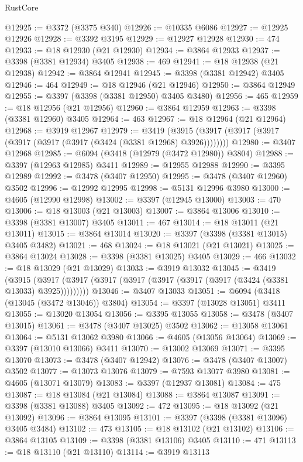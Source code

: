 \begin{lexlean}{RustCore}
\begin{coremodule}
@12925 := @3372 (@3375 @340)
@12926 := @10335 @6086
@12927 := @12925 @12926
@12928 := @3392 @3195
@12929 := @12927 @12928
@12930 := 474
@12933 := @18 @12930 (@21 @12930)
@12934 := @3864 @12933
@12937 := @3398 (@3381 @12934) @3405
@12938 := 469
@12941 := @18 @12938 (@21 @12938)
@12942 := @3864 @12941
@12945 := @3398 (@3381 @12942) @3405
@12946 := 464
@12949 := @18 @12946 (@21 @12946)
@12950 := @3864 @12949
@12955 := @3397 (@3398 (@3381 @12950) @3405 @3480)
@12956 := 465
@12959 := @18 @12956 (@21 @12956)
@12960 := @3864 @12959
@12963 := @3398 (@3381 @12960) @3405
@12964 := 463
@12967 := @18 @12964 (@21 @12964)
@12968 := @3919 @12967
@12979 := @3419 (@3915 (@3917 (@3917 (@3917 (@3917 (@3917 (@3917 (@3424 (@3381 @12968) @3926))))))))
@12980 := @3407 @12968
@12985 := @6094 (@3418 (@12979 (@3472 @12980)) @3804)
@12988 := @3397 (@12963 @12985) @3411
@12989 := @12955 @12988
@12990 := @3395 @12989
@12992 := @3478 (@3407 @12950)
@12995 := @3478 (@3407 @12960) @3502
@12996 := @12992 @12995
@12998 := @5131 @12996 @3980
@13000 := @4605 (@12990 @12998)
@13002 := @3397 (@12945 @13000)
@13003 := 470
@13006 := @18 @13003 (@21 @13003)
@13007 := @3864 @13006
@13010 := @3398 (@3381 @13007) @3405
@13011 := 467
@13014 := @18 @13011 (@21 @13011)
@13015 := @3864 @13014
@13020 := @3397 (@3398 (@3381 @13015) @3405 @3482)
@13021 := 468
@13024 := @18 @13021 (@21 @13021)
@13025 := @3864 @13024
@13028 := @3398 (@3381 @13025) @3405
@13029 := 466
@13032 := @18 @13029 (@21 @13029)
@13033 := @3919 @13032
@13045 := @3419
    (@3915 (@3917 (@3917 (@3917 (@3917 (@3917 (@3917 (@3917 (@3424 (@3381 @13033) @3925)))))))))
@13046 := @3407 @13033
@13051 := @6094 (@3418 (@13045 (@3472 @13046)) @3804)
@13054 := @3397 (@13028 @13051) @3411
@13055 := @13020 @13054
@13056 := @3395 @13055
@13058 := @3478 (@3407 @13015)
@13061 := @3478 (@3407 @13025) @3502
@13062 := @13058 @13061
@13064 := @5131 @13062 @3980
@13066 := @4605 (@13056 @13064)
@13069 := @3397 (@13010 @13066) @3411
@13070 := @13002 @13069
@13071 := @3395 @13070
@13073 := @3478 (@3407 @12942)
@13076 := @3478 (@3407 @13007) @3502
@13077 := @13073 @13076
@13079 := @7593 @13077 @3980
@13081 := @4605 (@13071 @13079)
@13083 := @3397 (@12937 @13081)
@13084 := 475
@13087 := @18 @13084 (@21 @13084)
@13088 := @3864 @13087
@13091 := @3398 (@3381 @13088) @3405
@13092 := 472
@13095 := @18 @13092 (@21 @13092)
@13096 := @3864 @13095
@13101 := @3397 (@3398 (@3381 @13096) @3405 @3484)
@13102 := 473
@13105 := @18 @13102 (@21 @13102)
@13106 := @3864 @13105
@13109 := @3398 (@3381 @13106) @3405
@13110 := 471
@13113 := @18 @13110 (@21 @13110)
@13114 := @3919 @13113

\end{coremodule}
\end{lexlean}
